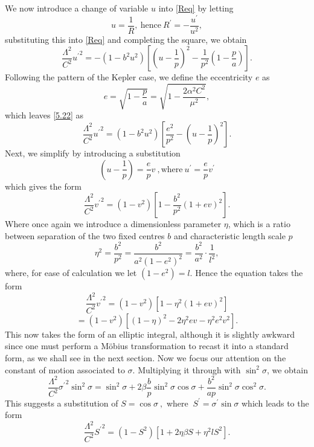 \documentclass[12pt,oneside]{report}
\theoremstyle{definition}
\begin{document}
We now introduce a change of variable $u$ into \autoref{Req} by letting
$$ u = \frac{1}{R}, \ \text{hence} \ R^{\prime} = -\frac{u^{\prime}}{u^{2}},$$
substituting this into \autoref{Req} and completing the square, we obtain
\begin{equation}\label{5.22}
  \frac{\Lambda^{2}}{C^{2}}{u^{\prime}}^{2}  = -(1-b^{2}u^{2}) \left[ \left(u-\frac{1}{p}\right)^{2}-\frac{1}{p^{2}}\left(1-\frac{p}{a}\right)\right].
\end{equation}
Following the pattern of the Kepler case, we define the eccentricity $e$ as
$$ e = \sqrt{1-\frac{p}{a}} = \sqrt{1 - \frac{2\alpha^{2}C^{2}}{\mu^{2}}},$$
which leaves \autoref{5.22} as
$$ \frac{\Lambda^{2}}{C^{2}}{u^{\prime}}^{2} = (1-b^{2}u^{2}) \left[  \frac{e^{2}}{p^{2}} - \left( u -\frac{1}{p}\right)^{2} \right].$$
Next, we simplify by introducing a substitution
$$ \left( u - \frac{1}{p} \right) = \frac{e}{p} v  \ , \text{where} \ u^{\prime} = \frac{e}{p}v^{\prime}$$
which gives the form
$$ \frac{\Lambda^{2}}{C^{2}}{v^{\prime}}^{2} = (1-v^{2}) \left[1-\frac{b^2}{p^{2}}(1+ev)^{2}\right].$$
Where once again we introduce a dimensionless parameter $\eta$, which is a ratio between separation of the two fixed centres $b$ and characteristic length scale $p$
$$ \eta^{2} = \frac{b^{2}}{p^{2}} = \frac{b^{2}}{a^{2}(1-e^{2})^{2}} = \frac{b^{2}}{a^{2}} \cdot \frac{1}{l^{2}},$$
where, for ease of calculation we let $(1-e^{2}) = l$. Hence the equation takes the form
$$ \frac{\Lambda^{2}}{C^{2}} {v^{\prime}}^{2} = (1-v^{2}) \left[1 - \eta^{2}(1+ev)^{2} \right]$$
\begin{equation}\label{v eqn}
    = (1-v^{2}) \left[ (1-\eta)^{2} - 2 \eta^{2}ev -\eta^{2}e^{2}v^{2}
    \right].
\end{equation}
This now takes the form of an elliptic integral, although it is slightly awkward since one must perform a Möbius transformation to recast it into a standard form, as we shall see in the next section. Now we focus our attention on the constant of motion associated to $\sigma$. Multiplying it through with $\sin^{2}{\sigma}$, we obtain
$$ \frac{\Lambda^{2}}{C^{2}}{\sigma^{\prime}}^{2}\sin^{2}{\sigma} = \sin^{2}{\sigma}+2\beta \frac{b}{p}\sin^{2}{\sigma}\cos{\sigma} + \frac{b^{2}}{ap}\sin^{2}{\sigma}\cos^{2}{\sigma}.$$
This suggests a substitution of $S = \cos{\sigma} \ ,$ where $ \ S^{\prime} = \sigma^{\prime} \sin{\sigma}$ which leads to the form
\begin{equation}\label{S eqn}
    \frac{\Lambda^{2}}{C^{2}}{S^{\prime}}^{2} = (1-S^{2})\left[ 1+2\eta\beta S + \eta^{2}lS^{2} \right].
\end{equation}
\end{document}

